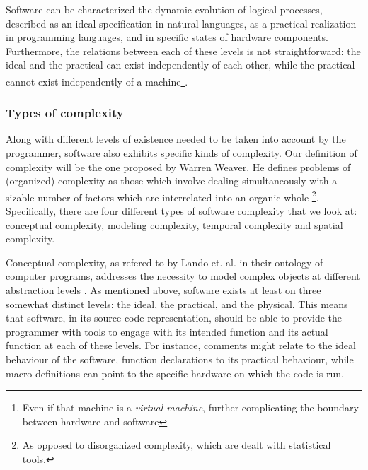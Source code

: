 Software can be characterized the dynamic evolution of logical processes, described as an ideal specification in natural languages, as a practical realization in programming languages, and in specific states of hardware components. Furthermore, the relations between each of these levels is not straightforward: the ideal and the practical can exist independently of each other, while the practical cannot exist independently of a machine\footnote{Even if that machine is a \emph{virtual machine}, further complicating the boundary between hardware and software}.

\subsubsection{Types of complexity}
\label{subsubsec:types-complexity}

Along with different levels of existence needed to be taken into account by the programmer, software also exhibits specific kinds of complexity. Our definition of complexity will be the one proposed by Warren Weaver. He defines problems of (organized) complexity as those which involve dealing simultaneously with a sizable number of factors which are interrelated into an organic whole \citep{weaver_science_1948}\footnote{As opposed to disorganized complexity, which are dealt with statistical tools.}. Specifically, there are four different types of software complexity that we look at: conceptual complexity, modeling complexity, temporal complexity and spatial complexity.

Conceptual complexity, as refered to by Lando et. al. in their ontology of computer programs, addresses the necessity to model complex objects at different abstraction levels \citep{lando_general_2007}. As mentioned above, software exists at least on three somewhat distinct levels: the ideal, the practical, and the physical. This means that software, in its source code representation, should be able to provide the programmer with tools to engage with its intended function and its actual function at each of these levels. For instance, comments might relate to the ideal behaviour of the software, function declarations to its practical behaviour, while macro definitions can point to the specific hardware on which the code is run.


